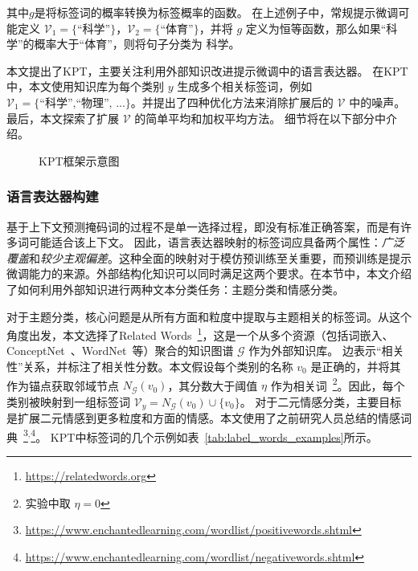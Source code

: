 其中$g$是将标签词的概率转换为标签概率的函数。
在上述例子中，常规提示微调可能定义 $\mathcal{V}_1=\{\text{``科学''}\}$，$\mathcal{V}_2=\text{\{``体育''}\}$，并将 $g$ 定义为恒等函数，那么如果“科学”的概率大于“体育”，则将句子分类为 \textsc{科学}。

本文提出了KPT，主要关注利用外部知识改进提示微调中的语言表达器。
在KPT中，本文使用知识库为每个类别 $y$ 生成多个相关标签词，例如 $\mathcal{V}_1 = \text{\{``科学'',``物理'', ...\}}$。并提出了四种优化方法来消除扩展后的 $\mathcal{V}$ 中的噪声。最后，本文探索了扩展 $\mathcal{V}$ 的简单平均和加权平均方法。
细节将在以下部分中介绍。

\begin{figure*}[!htbp]
  \centering
{}
  \caption{KPT框架示意图}
  \label{fig:my_label}
\end{figure*}


\subsubsection{语言表达器构建}
\label{sec:cons}

基于上下文预测掩码词的过程不是单一选择过程，即没有标准正确答案，而是有许多词可能适合该上下文。
因此，语言表达器映射的标签词应具备两个属性：\textit{广泛覆盖}和\textit{较少主观偏差}。这种全面的映射对于模仿预训练至关重要，而预训练是提示微调能力的来源。外部结构化知识可以同时满足这两个要求。在本节中，本文介绍了如何利用外部知识进行两种文本分类任务：主题分类和情感分类。

对于主题分类，核心问题是从所有方面和粒度中提取与主题相关的标签词。从这个角度出发，本文选择了Related Words~\footnote{\url{https://relatedwords.org}}，这是一个从多个资源（包括词嵌入、ConceptNet~\cite{speer2017conceptnet}、WordNet~\cite{pedersen2004wordnet}等）聚合的知识图谱 $\mathcal{G}$ 作为外部知识库。
边表示“相关性”关系，并标注了相关性分数。本文假设每个类别的名称 $v_0$ 是正确的，并将其作为锚点获取邻域节点 $N_{\mathcal{G}}(v_0)$，其分数大于阈值 $\eta$ 作为相关词~\footnote{实验中取 $\eta=0$}。因此，每个类别被映射到一组标签词 $\mathcal{V}_{y} = N_{\mathcal{G}}(v_0) \cup \{v_0\}$。
对于二元情感分类，主要目标是扩展二元情感到更多粒度和方面的情感。本文使用了之前研究人员总结的情感词典~\footnote{\url{https://www.enchantedlearning.com/wordlist/positivewords.shtml}}$^{,}$\footnote{ \url{https://www.enchantedlearning.com/wordlist/negativewords.shtml}}。
KPT中标签词的几个示例如表~\ref{tab:label_words_examples}所示。

